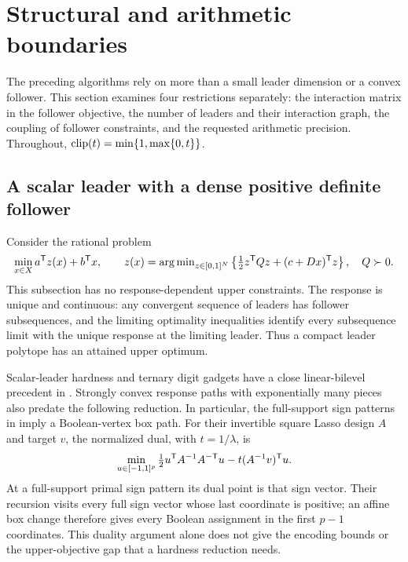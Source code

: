 \section{Structural and arithmetic boundaries}\label{sec:boundaries}
The preceding algorithms rely on more than a small leader dimension or a
convex follower. This section examines four restrictions separately: the
interaction matrix in the follower
objective, the number of leaders and their interaction graph, the coupling of
follower constraints, and the requested arithmetic precision.
Throughout, \(\operatorname{clip}(t)=\min\{1,\max\{0,t\}\}\).

\subsection{A scalar leader with a dense positive definite follower}
\label{subsec:dense-hardness}
Consider the rational problem
\begin{equation}\label{eq:dense-box-model}
 \min_{x\in X} a^{\mathsf T} z(x)+b^{\mathsf T} x,\qquad
 z(x)=\operatorname{arg\,min}_{z\in[0,1]^N}
 \left\{\tfrac12z^{\mathsf T} Qz+(c+Dx)^{\mathsf T} z\right\},\quad Q\succ0.
\end{equation}
This subsection has no response-dependent upper constraints. The response is
unique and continuous: any convergent sequence of leaders has
follower subsequences, and the limiting optimality inequalities identify every
subsequence limit with the unique response at the limiting leader. Thus a
compact leader polytope has an attained upper optimum.

Scalar-leader hardness and ternary digit gadgets have a close linear-bilevel
precedent in \citet[Theorem~1 and Section~4]{SugishitaCarvalho2026}. Strongly
convex response paths with exponentially many pieces also predate the
following reduction. In particular, the full-support sign patterns in
\citet[Proposition~2, equation~(4)]{MairalYu2012} imply a Boolean-vertex box path.
For their invertible square Lasso design \(A\) and target \(v\), the normalized
dual, with \(t=1/\lambda\), is
\[
 \min_{u\in[-1,1]^p}\tfrac12u^{\mathsf T} A^{-1}A^{-\mathsf T}u
       -t(A^{-1}v)^{\mathsf T} u.
\]
At a full-support primal sign pattern its dual point is that sign vector.
Their recursion visits every full sign vector whose last coordinate is positive;
an affine box change therefore gives every Boolean assignment in the first
\(p-1\) coordinates. This duality argument alone does not give the encoding
bounds or the upper-objective gap that a hardness reduction needs.

